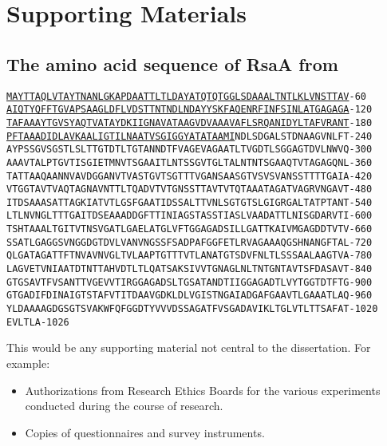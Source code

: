 \chapter{Supporting Materials}
\section{The amino acid sequence of RsaA from \caulobacter}
\label{app:rsaseq}
\texttt{\underline{MAYTTAQLVTAYTNANLGKAPDAATTLTLDAYATQTQTGGLSDAAALTNTLKLVNSTTAV}\hfill-60~~\\
\underline{AIQTYQFFTGVAPSAAGLDFLVDSTTNTNDLNDAYYSKFAQENRFINFSINLATGAGAGA}\hfill-120~\\
\underline{TAFAAAYTGVSYAQTVATAYDKIIGNAVATAAGVDVAAAVAFLSRQANIDYLTAFVRANT}\hfill-180~\\
\underline{PFTAAADIDLAVKAALIGTILNAATVSGIGGYATATAAMI}NDLSDGALSTDNAAGVNLFT\hfill-240~\\
AYPSSGVSGSTLSLTTGTDTLTGTANNDTFVAGEVAGAATLTVGDTLSGGAGTDVLNWVQ\hfill-300~\\
AAAVTALPTGVTISGIETMNVTSGAAITLNTSSGVTGLTALNTNTSGAAQTVTAGAGQNL\hfill-360~\\
TATTAAQAANNVAVDGGANVTVASTGVTSGTTTVGANSAASGTVSVSVANSSTTTTGAIA\hfill-420~\\
VTGGTAVTVAQTAGNAVNTTLTQADVTVTGNSSTTAVTVTQTAAATAGATVAGRVNGAVT\hfill-480~\\
ITDSAAASATTAGKIATVTLGSFGAATIDSSALTTVNLSGTGTSLGIGRGALTATPTANT\hfill-540~\\
LTLNVNGLTTTGAITDSEAAADDGFTTINIAGSTASSTIASLVAADATTLNISGDARVTI\hfill-600~\\
TSHTAAALTGITVTNSVGATLGAELATGLVFTGGAGADSILLGATTKAIVMGAGDDTVTV\hfill-660~\\
SSATLGAGGSVNGGDGTDVLVANVNGSSFSADPAFGGFETLRVAGAAAQGSHNANGFTAL\hfill-720~\\
QLGATAGATTFTNVAVNVGLTVLAAPTGTTTVTLANATGTSDVFNLTLSSSAALAAGTVA\hfill-780~\\
LAGVETVNIAATDTNTTAHVDTLTLQATSAKSIVVTGNAGLNLTNTGNTAVTSFDASAVT\hfill-840~\\
GTGSAVTFVSANTTVGEVVTIRGGAGADSLTGSATANDTIIGGAGADTLVYTGGTDTFTG\hfill-900~\\
GTGADIFDINAIGTSTAFVTITDAAVGDKLDLVGISTNGAIADGAFGAAVTLGAAATLAQ\hfill-960~\\
YLDAAAAGDGSGTSVAKWFQFGGDTYVVVDSSAGATFVSGADAVIKLTGLVTLTTSAFAT\hfill-1020\\
EVLTLA\hfill-1026}

This would be any supporting material not central to the dissertation.
For example:
\begin{itemize}
\item Authorizations from Research Ethics Boards for the various
    experiments conducted during the course of research.
\item Copies of questionnaires and survey instruments.
\end{itemize}
